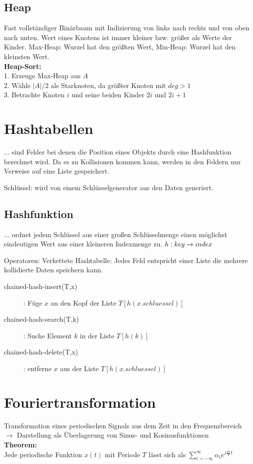 \documentclass[fs, footer]{latex4ei}
\begin{document}
\begin{multicols*}{4}
{{\subsection{Heap}
Fast vollständiger Binärbaum mit Indizierung von links nach rechts und von oben nach unten.
Wert eines Knotens ist immer kleiner bzw. größer als Werte der Kinder. 
Max-Heap: Wurzel hat den größten Wert, Min-Heap: Wurzel hat den kleinsten Wert.\\
\textbf{Heap-Sort:}\\
1. Erzeuge Max-Heap aus $A$\\
2. Wähle $|A| / 2$ als Starknoten, da größter Knoten mit $deg > 1$\\
3. Betrachte Knoten $i$ und seine beiden Kinder $2i$ und $2i+1$ \\

\section{Hashtabellen}
	... sind Felder bei denen die Position eines Objekts durch eine Hashfunktion berechnet wird. Da es zu Kollisionen kommen kann, werden in den Feldern nur Verweise auf eine Liste gespeichert.

	Schlüssel: wird von einem Schlüsselgenerator aus den Daten generiert. 
\subsection{Hashfunktion}
	... ordnet jedem Schlüssel aus einer großen Schlüsselmenge einen möglichst eindeutigen Wert aus einer kleineren Indexmenge zu.
	$h: key \rightarrow index$
	
Operatoren:
Verkettete Hashtabelle: Jedes Feld entspricht einer Liste die mehrere kollidierte Daten speichern kann. 
\begin{description}
	\item[chained-hash-insert(T,x)]: Füge $x$ an den Kopf der Liste $T[ h(x.schluessel)]$
	\item[chained-hash-search(T,k)]: Suche Element $k$ in der Liste $T[ h(k) ]$
	\item[chained-hash-delete(T,x)]: entferne $x$ aus der Liste $T[h(x.schluessel)]$
\end{description}

\section{Fouriertransformation}
Transformation eines periodischen Signals aus dem Zeit in den Frequenzbereich $\rightarrow$ Darstellung als Überlagerung von Sinus- und Kosinusfunktionen\\
\textbf{Theorem:}\\
Jede periodische Funktion $x(t)$ mit Periode $T$ lässt sich als $\sum_{i=-\infty}^\infty \alpha_i e^{j\frac{2\pi}{T}t}$
}}
\end{multicols*}
\end{document}
